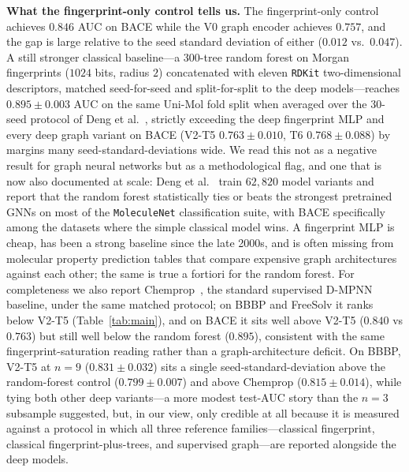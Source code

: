 \documentclass[conference]{IEEEtran}
\begin{document}
\noindent\textbf{What the fingerprint-only control tells us.}
The fingerprint-only control achieves $0.846$ AUC on BACE while the V0 graph encoder achieves $0.757$, and the gap is large relative to the seed standard deviation of either ($0.012$ vs.\ $0.047$). A still stronger classical baseline---a 300-tree random forest on Morgan fingerprints ($1024$ bits, radius $2$) concatenated with eleven \texttt{RDKit} two-dimensional descriptors, matched seed-for-seed and split-for-split to the deep models---reaches $0.895 \pm 0.003$ AUC on the same Uni-Mol fold split when averaged over the 30-seed protocol of Deng et al.~\cite{deng2023systematic}, strictly exceeding the deep fingerprint MLP and every deep graph variant on BACE (V2-T5 $0.763 \pm 0.010$, T6 $0.768 \pm 0.088$) by margins many seed-standard-deviations wide. We read this not as a negative result for graph neural networks but as a methodological flag, and one that is now also documented at scale: Deng et al.~\cite{deng2023systematic} train $62{,}820$ model variants and report that the random forest statistically ties or beats the strongest pretrained GNNs on most of the \texttt{MoleculeNet} classification suite, with BACE specifically among the datasets where the simple classical model wins. A fingerprint MLP is cheap, has been a strong baseline since the late 2000s, and is often missing from molecular property prediction tables that compare expensive graph architectures against each other; the same is true a fortiori for the random forest. For completeness we also report Chemprop~\cite{yang2019chemprop}, the standard supervised D-MPNN baseline, under the same matched protocol; on BBBP and FreeSolv it ranks below V2-T5 (Table~\ref{tab:main}), and on BACE it sits well above V2-T5 ($0.840$ vs $0.763$) but still well below the random forest ($0.895$), consistent with the same fingerprint-saturation reading rather than a graph-architecture deficit. On BBBP, V2-T5 at $n{=}9$ ($0.831 \pm 0.032$) sits a single seed-standard-deviation above the random-forest control ($0.799 \pm 0.007$) and above Chemprop ($0.815 \pm 0.014$), while tying both other deep variants---a more modest test-AUC story than the $n{=}3$ subsample suggested, but, in our view, only credible at all because it is measured against a protocol in which all three reference families---classical fingerprint, classical fingerprint-plus-trees, and supervised graph---are reported alongside the deep models.
\end{document}
